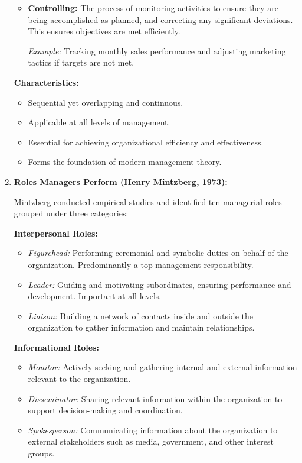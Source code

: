 \documentclass[12pt,a4paper]{book}
\begin{document}
\begin{enumerate}
\begin{itemize}
        \item \textbf{Controlling:}
        The process of monitoring activities to ensure they are being accomplished as planned, and correcting any significant deviations. This ensures objectives are met efficiently.

        \textit{Example:} Tracking monthly sales performance and adjusting marketing tactics if targets are not met.
    \end{itemize}

    \textbf{Characteristics:}
    \begin{itemize}
        \item Sequential yet overlapping and continuous.
        \item Applicable at all levels of management.
        \item Essential for achieving organizational efficiency and effectiveness.
        \item Forms the foundation of modern management theory.
    \end{itemize}

    \item \textbf{Roles Managers Perform (Henry Mintzberg, 1973):}

    Mintzberg conducted empirical studies and identified ten managerial roles grouped under three categories:

    \textbf{Interpersonal Roles:}
    \begin{itemize}
        \item \textit{Figurehead:} Performing ceremonial and symbolic duties on behalf of the organization. Predominantly a top-management responsibility.
        \item \textit{Leader:} Guiding and motivating subordinates, ensuring performance and development. Important at all levels.
        \item \textit{Liaison:} Building a network of contacts inside and outside the organization to gather information and maintain relationships.
    \end{itemize}

    \textbf{Informational Roles:}
    \begin{itemize}
        \item \textit{Monitor:} Actively seeking and gathering internal and external information relevant to the organization.
        \item \textit{Disseminator:} Sharing relevant information within the organization to support decision-making and coordination.
        \item \textit{Spokesperson:} Communicating information about the organization to external stakeholders such as media, government, and other interest groups.
    \end{itemize}


\end{enumerate}
\end{document}
